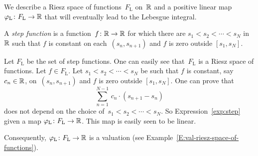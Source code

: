 \documentclass[main.tex]{subfiles}
\begin{document}
%
%
\begin{ex}
\label{E:sint-val}
We  describe a Riesz space
of functions~$F_{\mathrm{L}}$ on~$\mathbb{R}$
and a positive linear map~$\varphi_{\mathrm{L}}\colon F_{\mathrm{L}}\rightarrow \mathbb{R}$
that will eventually lead to the Lebesgue integral.

A \emph{step function} is a function~$f\colon \mathbb{R}\rightarrow\mathbb{R}$
for which there are $s_1 < s_2 <\dotsb <s_N$ in~$\mathbb{R}$
such that $f$ is constant on each~$(s_n,s_{n+1})$
and $f$ is zero outside $[s_1,s_N]$.

Let $F_\mathrm{L}$ be the set of step functions.
One can easily see that~$F_\mathrm{L}$ is a Riesz space of functions.
Let $f\in F_\mathrm{L}$.
Let $s_1 < s_2 <\dotsb <s_N$
be such that $f$ is constant, say $c_n\in \mathbb{R}$,
 on~$(s_n,s_{n+1})$
and $f$ is zero outside $[s_1,s_N]$.
One can prove that 
\begin{equation}
\label{exp:step}
\sum_{n=1}^{N-1} \, c_n\cdot(s_{n+1} - s_n)
\end{equation}
does not depend on the choice
of~$s_1 < s_2 <\dotsb <s_N$.
So Expression~\eqref{exp:step}
given a map $\varphi_\mathrm{L}\colon F_\mathrm{L} \rightarrow \mathbb{R}$.
This map is easily seen to be linear.

Consequently, $\varphi_\mathrm{L}\colon F_\mathrm{L}\rightarrow \mathbb{R}$
is a valuation (see Example~\ref{E:val-riesz-space-of-functions}).
\end{ex}

%
%
\begin{ex}
\end{ex}
\end{document}
